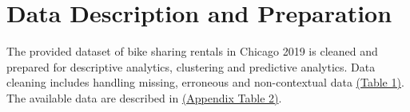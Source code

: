 \section{Data Description and Preparation}
\label{sec:DataDescription}
The provided dataset of bike sharing rentals in Chicago 2019 is cleaned and prepared for descriptive analytics, clustering and predictive analytics. Data cleaning includes handling missing, erroneous and non-contextual data \hyperref[tab:dataCleaningPreparation]{(Table 1)}. The available data are described in \hyperref[tab:dataDescription]{(Appendix Table 2)}. 
